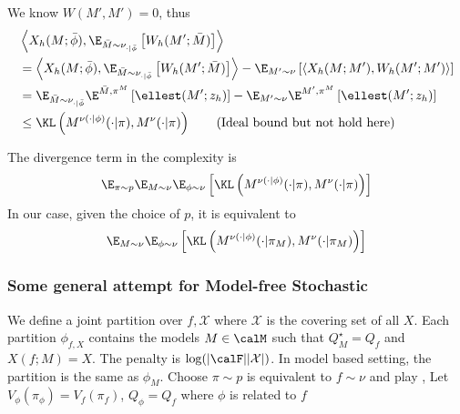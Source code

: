 We know $W(M', M') = 0$, thus
\begin{align*}
&\left\langle X_h(M;\Bar{\phi}), \E_{\Bar{M}\sim\nu_{\cdot|\Bar{\phi}}}\left[W_h(M';\Bar{M})\right] \right\rangle 
\\&= \left\langle X_h(M;\Bar{\phi}), \E_{\Bar{M}\sim\nu_{\cdot|\Bar{\phi}}}\left[W_h(M';\Bar{M})\right] \right\rangle - \E_{M' \sim \nu}\left[\left\langle X_h(M;M'), W_h(M';M') \right\rangle\right]  
\\&= \E_{\Bar{M} \sim \nu_{\cdot|\Bar{\phi}}}\E^{\Bar{M}, \pi^M}\left[\ellest(M';z_h)\right] -  \E_{M' \sim \nu}\E^{M', \pi^M}\left[\ellest(M';z_h)\right] 
\\&\le \KL\left(M^{\nu(\cdot|\phi)}(\cdot|\pi),  M^{\nu}(\cdot|\pi) \right) \tag{Ideal bound but not hold here}
\end{align*}






The divergence term in the complexity is 
\begin{align*}
    \E_{\pi \sim p}\E_{M \sim \nu}\E_{\phi \sim \nu}\left[\KL\left(M^{\nu(\cdot|\phi)}(\cdot|\pi),  M^{\nu}(\cdot|\pi) \right)\right]
\end{align*}
In our case, given the choice of $p$, it is equivalent to 
\begin{align*}
    \E_{M \sim \nu}\E_{\phi \sim \nu}\left[\KL\left(M^{\nu(\cdot|\phi)}(\cdot|\pi_M), M^{\nu}(\cdot|\pi_M) \right)\right]
\end{align*}

\subsubsection{Some general attempt for Model-free Stochastic}
We define a joint partition over $f, \mathcal{X}$ where $\mathcal{X}$ is the covering set of all $X$. Each partition $\phi_{f, X}$ contains the models $M \in \calM$ such that $Q_M^\star = Q_f$ and $X(f; M) = X$. The penalty is $\log(|\calF||\mathcal{X}|)$.
In model based setting, the partition is the same as $\phi_M$. Choose $\pi \sim p$ is equivalent to $f \sim \nu$ and play , Let $V_{\phi}(\pi_\phi) = V_{f}(\pi_f)$,  $Q_{\phi} = Q_{f}$ where $\phi$ is related to $f$


